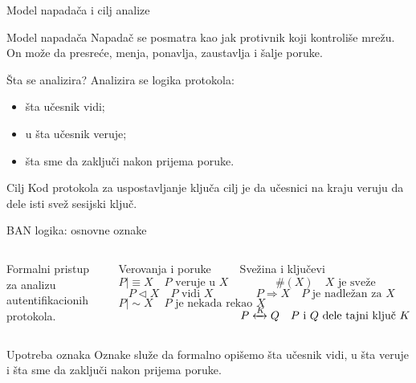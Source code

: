 \documentclass[aspectratio=1610]{beamer}
\begin{document}
\begin{frame}[t]{Model napadača i cilj analize}
\small

\begin{block}{Model napadača}
Napadač se posmatra kao jak protivnik koji kontroliše mrežu. On može da presreće, menja, ponavlja, zaustavlja i šalje poruke.
\end{block}

\vspace{0.25em}

\begin{block}{Šta se analizira?}
Analizira se logika protokola:
\begin{itemize}
    \item šta učesnik vidi;
    \item u šta učesnik veruje;
    \item šta sme da zaključi nakon prijema poruke.
\end{itemize}
\end{block}

\vspace{0.25em}

\begin{alertblock}{Cilj}
Kod protokola za uspostavljanje ključa cilj je da učesnici na kraju veruju da dele isti svež sesijski ključ.
\end{alertblock}

\end{frame}





\begin{frame}[t]{BAN logika: osnovne oznake}
\small
\begin{columns}[T,onlytextwidth]
Formalni pristup za analizu autentifikacionih protokola.
\begin{block}{Verovanja i poruke}
\[
P\mid\equiv X \quad \text{$P$ veruje u $X$}
\]
\[
P\triangleleft X \quad \text{$P$ vidi $X$}
\]
\[
P\mid\sim X \quad \text{$P$ je nekada rekao $X$}
\]
\end{block}

\begin{block}{Svežina i ključevi}
\[
\#(X) \quad \text{$X$ je sveže}
\]
\[
P\Rightarrow X \quad \text{$P$ je nadležan za $X$}
\]
\[
P \xleftrightarrow{K} Q \quad \text{$P$ i $Q$ dele tajni ključ $K$}
\]
\end{block}
\end{columns}

\vspace{0.3em}
\begin{alertblock}{Upotreba oznaka}
Oznake služe da formalno opišemo šta učesnik vidi, u šta veruje i šta sme da zaključi nakon prijema poruke.
\end{alertblock}
\end{frame}
\end{document}

